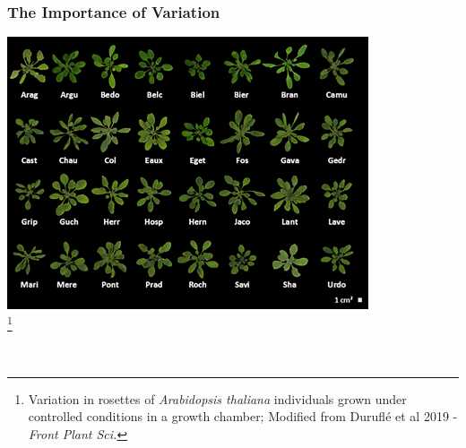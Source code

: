 \documentclass{beamer}
\newcommand\blfootnote[1]{%
	\begingroup
	\renewcommand\thefootnote{}\footnote{#1}%
	\addtocounter{footnote}{-1}%
	\endgroup
}
\begin{document}
	
	


\begin{frame}
	\frametitle{The Importance of Variation}
	\centering \includegraphics[keepaspectratio, width  = 0.8\textwidth]{img/arabidopsisVariation}\\
	\blfootnote{Variation in rosettes of \textit{Arabidopsis thaliana} individuals grown under controlled conditions in a growth chamber; Modified from Duruflé et al 2019 - \textit{Front Plant Sci.}}\\ 
\end{frame}						
			
\end{document}
